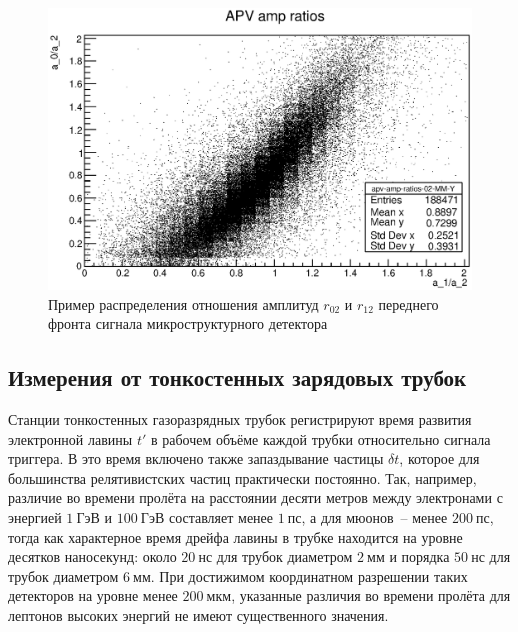 \begin{figure}
    \centering
    \includegraphics[width=0.45\linewidth]{images/illustrative/banana-example.eps}
    \caption{Пример распределения отношения амплитуд $r_{02}$ и $r_{12}$ переднего
    фронта сигнала микроструктурного детектора}
    \label{fig:banana-histogram}
\end{figure}

\subsection{Измерения от тонкостенных зарядовых трубок}

Станции тонкостенных газоразрядных трубок регистрируют время развития
электронной лавины $t'$ в рабочем объёме каждой трубки относительно
сигнала триггера. В это время включено также запаздывание
частицы $\delta t$, которое для большинства релятивистских частиц
практически постоянно. Так, например, различие
во времени пролёта на расстоянии десяти метров между электронами с
энергией $1~\text{ГэВ}$ и $100~\text{ГэВ}$ составляет менее $1~\text{пс}$,
а для мюонов~-- менее $200~\text{пс}$, тогда как характерное время
дрейфа лавины в трубке находится на уровне десятков наносекунд:
около $20~\text{нс}$ для трубок диаметром $2~\text{мм}$ и порядка
$50~\text{нс}$ для трубок диаметром $6~\text{мм}$. При достижимом
координатном разрешении таких детекторов на уровне менее $200~\text{мкм}$,
указанные различия во времени пролёта для лептонов высоких энергий
не имеют существенного значения.

